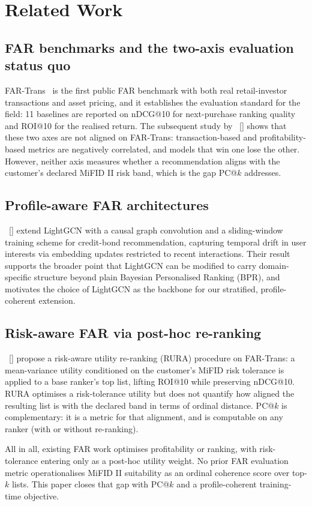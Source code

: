 \section{Related Work}
\label{sec:relatedwork}

\subsection{FAR benchmarks and the two-axis evaluation status quo}
FAR-Trans~\cite{sanzcruzado:fartrans} is the first public FAR benchmark with both real retail-investor transactions and asset pricing, and it establishes the evaluation standard for the field: 11 baselines are reported on nDCG@10 for next-purchase ranking quality and ROI@10 for the realised return. The subsequent study by \citeauthor{sanzcruzado:investors}~[\citeyear{sanzcruzado:investors}] shows that these two axes are not aligned on FAR-Trans: transaction-based and profitability-based metrics are negatively correlated, and models that win one lose the other. However, neither axis measures whether a recommendation aligns with the customer's declared MiFID II risk band, which is the gap PC@$k$ addresses.

\subsection{Profile-aware FAR architectures}
\citeauthor{ghiye:rolling-forward}~[\citeyear{ghiye:rolling-forward}] extend LightGCN with a causal graph convolution and a sliding-window training scheme for credit-bond recommendation, capturing temporal drift in user interests via embedding updates restricted to recent interactions. Their result supports the broader point that LightGCN can be modified to carry domain-specific structure beyond plain Bayesian Personalised Ranking (BPR), and motivates the choice of LightGCN as the backbone for our stratified, profile-coherent extension.

\subsection{Risk-aware FAR via post-hoc re-ranking}
\citeauthor{sakurai:risk-aware}~[\citeyear{sakurai:risk-aware}] propose a risk-aware utility re-ranking (RURA) procedure on FAR-Trans: a mean-variance utility conditioned on the customer's MiFID risk tolerance is applied to a base ranker's top list, lifting ROI@10 while preserving nDCG@10. RURA optimises a risk-tolerance utility but does not quantify how aligned the resulting list is with the declared band in terms of ordinal distance. PC@$k$ is complementary: it is a metric for that alignment, and is computable on any ranker (with or without re-ranking).

All in all, existing FAR work optimises profitability or ranking, with risk-tolerance entering only as a post-hoc utility weight. No prior FAR evaluation metric operationalises MiFID II suitability as an ordinal coherence score over top-$k$ lists. This paper closes that gap with PC@$k$ and a profile-coherent training-time objective.
